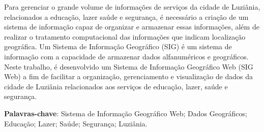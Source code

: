 \begin{resumo}

\imprimirreferenciaobra

Para gerenciar o grande volume de informações de serviços da cidade de Luziânia, relacionados a educação, lazer saúde e segurança, é necessário a criação de um sistema de informação capaz de organizar e armazenar essas informações, além de realizar o tratamento computacional das informações que indicam localização geográfica. Um Sistema de Informação Geográfico (SIG) é um sistema de informação com a capacidade de armazenar dados alfanuméricos e geográficos. Neste trabalho, é desenvolvido um Sistema de Informação Geográfico Web (SIG Web) a fim de facilitar a organização, gerenciamento e visualização de dados da cidade de Luziânia relacionados aos serviços de educação, lazer, saúde e segurança.

\textbf{Palavras-chave}: Sistema de Informação Geográfico Web; Dados Geográficos; Educação; Lazer; Saúde; Segurança; Luziânia.

\end{resumo} 